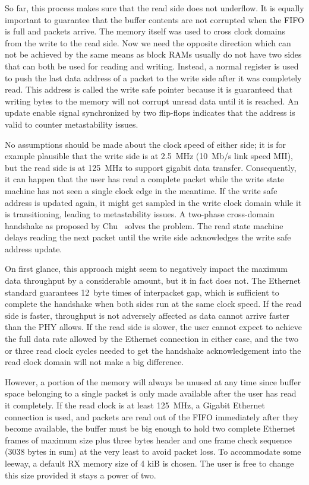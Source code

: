 \documentclass[a4paper, 11pt, oneside]{Thesis}  %
\begin{document}
So far, this process makes sure that the read side does not underflow. It is equally important to guarantee that the buffer contents are not corrupted when the FIFO is full and packets arrive. The memory itself was used to cross clock domains from the write to the read side. Now we need the opposite direction which can not be achieved by the same means as block RAMs usually do not have two sides that can both be used for reading and writing. Instead, a normal register is used to push the last data address of a packet to the write side after it was completely read. This address is called the write safe pointer because it is guaranteed that writing bytes to the memory will not corrupt unread data until it is reached. An update enable signal synchronized by two flip-flops indicates that the address is valid to counter metastability issues.

No assumptions should be made about the clock speed of either side; it is for example plausible that the write side is at 2.5~MHz (10~Mb/s link speed MII), but the read side is at 125~MHz to support gigabit data transfer. Consequently, it can happen that the user has read a complete packet while the write state machine has not seen a single clock edge in the meantime. If the write safe address is updated again, it might get sampled in the write clock domain while it is transitioning, leading to metastability issues.  A two-phase cross-domain handshake as proposed by Chu~\cite{RTLHardwareDesign} solves the problem. The read state machine delays reading the next packet until the write side acknowledges the write safe address update.

On first glance, this approach might seem to negatively impact the maximum data throughput by a considerable amount, but it in fact does not. The Ethernet standard guarantees 12~byte times of interpacket gap, which is sufficient to complete the handshake when both sides run at the same clock speed. If the read side is faster, throughput is not adversely affected as data cannot arrive faster than the PHY allows. If the read side is slower, the user cannot expect to achieve the full data rate allowed by the Ethernet connection in either case, and the two or three read clock cycles needed to get the handshake acknowledgement into the read clock domain will not make a big difference.

However, a portion of the memory will always be unused at any time since buffer space belonging to a single packet is only made available after the user has read it completely. If the read clock is at least 125~MHz, a Gigabit Ethernet connection is used, and packets are read out of the FIFO immediately after they become available, the buffer must be big enough to hold two complete Ethernet frames of maximum size plus three bytes header and one frame check sequence (3038 bytes in sum) at the very least to avoid packet loss. To accommodate some leeway, a default RX memory size of 4 kiB is chosen. The user is free to change this size provided it stays a power of two. 
\end{document}
